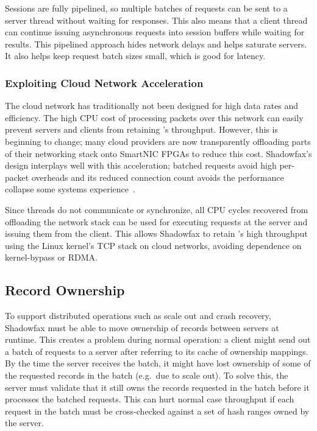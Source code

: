 Sessions are fully pipelined, so multiple batches of requests can be sent to a
server thread without waiting for responses.
%
This also means that a
client thread can continue issuing asynchronous requests into session
buffers while waiting for results.
%
This pipelined approach hides network delays and helps saturate servers.
%
It also helps keep request batch sizes small, which is good for latency.

%
%

\subsubsection{Exploiting Cloud Network Acceleration}

The cloud network has traditionally not been designed for high data
rates and efficiency.
%
The high CPU cost of processing packets over this network can easily
prevent servers and clients from retaining \faster's throughput.
%
However, this is beginning to change; many cloud providers are now
transparently offloading parts of their networking stack onto SmartNIC
FPGAs to reduce this cost.
%
Shadowfax's design interplays well with this acceleration; batched requests
avoid high per-packet overheads and its reduced connection count avoids the
performance collapse some systems experience~\cite{farm-2014}.

Since threads do not communicate or synchronize, all CPU cycles
recovered from offloading the network stack can be used for executing
requests at the server and issuing them from the client.
%
This allows Shadowfax to retain \faster's high throughput using the Linux
kernel's TCP stack on cloud networks, avoiding dependence on kernel-bypass
or RDMA.

\subsection{Record Ownership}
\label{sec:ownership}

To support distributed operations such as scale out and crash recovery,
Shadowfax must be able to move ownership of records between servers at
runtime.
%
This creates a problem during normal operation:
%
a client might send out a batch of requests to a server after referring
to its cache of ownership mappings.
%
By the time the server receives the batch, it might have lost ownership of
some of the requested records in the batch (e.g.\ due to scale out).
%
To solve this, the server must validate that it still owns the records requested
in the batch before it processes the batched requests.
%
This can hurt normal case throughput if each request in the
batch must be cross-checked against a set of hash ranges owned by the server.

